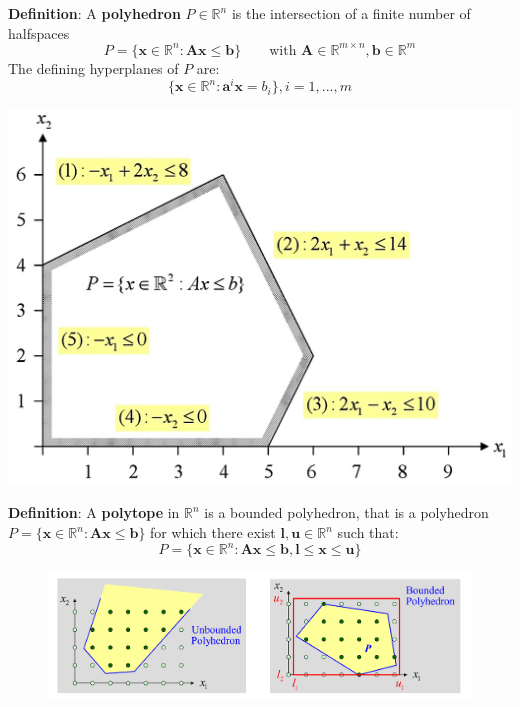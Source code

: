 \documentclass[11pt]{article}
\begin{document}
\noindent
\begin{minipage}{0.6\linewidth}
	\textbf{Definition}: A \textbf{polyhedron} $P\in\mathbb{R}^n$ is the intersection of a finite number of halfspaces
	\begin{equation*}
		P=\{ \textbf{x}\in\mathbb{R}^n:\textbf{A}\textbf{x}\leq\textbf{b} \} \qquad \text{with }\textbf{A}\in\mathbb{R}^{m\times n}, \textbf{b}\in\mathbb{R}^m
	\end{equation*}
	\noindent
	The defining hyperplanes of $P$ are:
	\begin{equation*}
		\{ \textbf{x}\in\mathbb{R}^n:\textbf{a}^i\textbf{x}=b_i \}, i=1,...,m
	\end{equation*}
\end{minipage}
\begin{minipage}{0.4\linewidth}
	\centering
	\includegraphics[width=\linewidth]{polyhedron_hyperplanes}
\end{minipage}

\vspace{1em}
\noindent
\textbf{Definition}: A \textbf{polytope} in $\mathbb{R}^n$ is a bounded polyhedron, that is a polyhedron $P=\{ \textbf{x}\in\mathbb{R}^n:\textbf{A}\textbf{x}\leq\textbf{b} \}$ for which there exist $\textbf{l},\textbf{u}\in\mathbb{R}^n$ such that:
\begin{equation*}
	P=\{ \textbf{x}\in\mathbb{R}^n:\textbf{A}\textbf{x}\leq\textbf{b}, \textbf{l}\leq\textbf{x}\leq\textbf{u} \}
\end{equation*}

\begin{figure}[H]
	\centering
	\includegraphics[width=0.8\linewidth, keepaspectratio]{polytope}
\end{figure}
\end{document}
